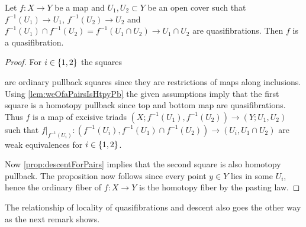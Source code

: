 \begin{corollary}\label{cor:locOfQuasifib}
    Let $f\colon X\to Y$ be a map and $U_1, U_2\subset Y$ be an open cover such that $f^{-1}(U_1)\to U_1$, $f^{-1}(U_2)\to U_2$ and $f^{-1}(U_1)\cap f^{-1}(U_2)=f^{-1}(U_1\cap U_2)\to U_1\cap U_2$ are quasifibrations.
    Then $f$ is a quasifibration.
    \begin{proof}
        For $i\in\left\lbrace1,2\right\rbrace$ the squares 
        \begin{center}
        \end{center} 
        are ordinary pullback squares since they are restrictions of maps along inclusions.
        Using \cref{lem:weOfaPairsIsHtpyPb} the given assumptions imply that the first square is a homotopy pullback since top and bottom map are quasifibrations.
        Thus $f$ is a map of excisive triads $(X;f^{-1}(U_1),f^{-1}(U_2))\to(Y;U_1,U_2)$ such that $f|_{f^{-1}(U_i)}\colon(f^{-1}(U_i),f^{-1}(U_1)\cap f^{-1}(U_2))\to (U_i,U_1\cap U_2)$ are weak equivalences for $i\in\left\lbrace1,2\right\rbrace$.

        Now \cref{prop:descentForPairs} implies that the second square is also homotopy pullback.
        The proposition now follows since every point $y\in Y$ lies in some $U_i$, hence the ordinary fiber of $f\colon X\to Y$ is the homotopy fiber by the pasting law.
    \end{proof}
\end{corollary}
The relationship of locality of quasifibrations and descent also goes the other way as the next remark shows.
